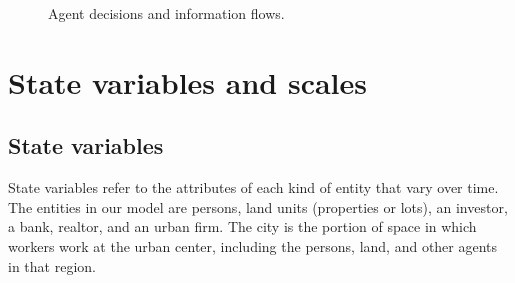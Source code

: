 \begin{figure}[h!tb]

        


  




\caption[Agent decisions and information flows]{Agent decisions and information flows.}
\label{fig:information-flows}
\end{figure}


\section{State variables and scales}
\subsection{State variables}
State variables refer to the attributes of each kind of entity that vary over time. %
The entities in our model are persons, land units (properties or lots), an investor, a bank,  realtor, and an urban firm. 
The city is the portion of space in which workers work at the urban center, including the persons, land, and other agents in that region. %

